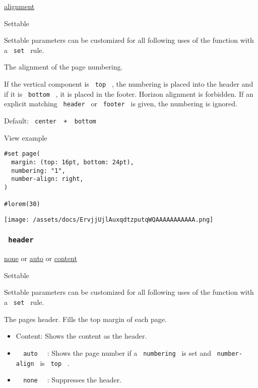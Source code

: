 \href{/docs/reference/layout/alignment/}{alignment}

{{ Settable }}

\label{parameters-number-align-settable-tooltip}
Settable parameters can be customized for all following uses of the
function with a \texttt{\ set\ } rule.

The alignment of the page numbering.

If the vertical component is \texttt{\ top\ } , the numbering is placed
into the header and if it is \texttt{\ bottom\ } , it is placed in the
footer. Horizon alignment is forbidden. If an explicit matching
\texttt{\ header\ } or \texttt{\ footer\ } is given, the numbering is
ignored.

Default: \texttt{\ center\ }{\texttt{\ +\ }}\texttt{\ bottom\ }


View example

\begin{verbatim}
#set page(
  margin: (top: 16pt, bottom: 24pt),
  numbering: "1",
  number-align: right,
)

#lorem(30)
\end{verbatim}

\texttt{[image: /assets/docs/ErvjjUjlAuxqdtzputqWQAAAAAAAAAAA.png]}

\subsubsection{\texorpdfstring{\texttt{\ header\ }}{ header }}\label{parameters-header}

\href{/docs/reference/foundations/none/}{none} {or}
\href{/docs/reference/foundations/auto/}{auto} {or}
\href{/docs/reference/foundations/content/}{content}

{{ Settable }}

\label{parameters-header-settable-tooltip}
Settable parameters can be customized for all following uses of the
function with a \texttt{\ set\ } rule.

The page\textquotesingle s header. Fills the top margin of each page.

\begin{itemize}
\tightlist
\item
  Content: Shows the content as the header.
\item
  \texttt{\ }{\texttt{\ auto\ }}\texttt{\ } : Shows the page number if a
  \texttt{\ numbering\ } is set and \texttt{\ number-align\ } is
  \texttt{\ top\ } .
\item
  \texttt{\ }{\texttt{\ none\ }}\texttt{\ } : Suppresses the header.
\end{itemize}

